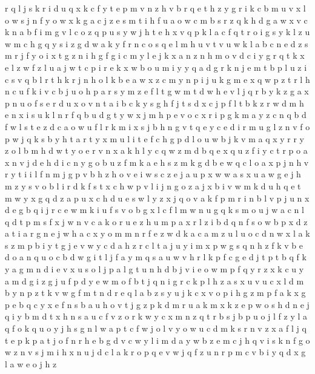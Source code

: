\documentclass{article}
\begin{document}
r q l j s k
r i d u q x k c f y t e p m v n z h
v b r q e
t h z y g r i k c b m u v x l o w s j n f
y
o w x k g a c j z e
s m t i h f u a o w c
m b s r z q k h d g a w x v c
k n a b f i m g v l c o z q p u s y w j h t e
h x v q
p k l a
c f q t r o i g s y k l z u w m
c h g q y s
i z g d w a k y f r n c o s q e l m h u v t
v u w k l a b c n e d z s m r j f y o i x t g
z n i h g
f g i c m y l e j k x a n z
n h m o v d c i y g r q t k x e l z w f
z l u a j w t c p i r e k x
w b o u
m i y
y q a d g r k n j e m t b p l u z i c s v
q b l r t h
k r j n h
o l k b e a w x z c m y n p i j u
k g m e x q w p z t r l h n c u f
k i v c b j u o h p a r s y m z e f l t g w
m t d w h e v l j q r b y k z g a x p n u o f s
e r d u x o v n t a i b c k y s g h f j
t s d
x
c j p f l t b k z r w d m h e n x i s u
k l n r f q b u d g t y w x j m h p e v o c
x r i p g k m a y z c n q b d f w l s t e
z d c a o w u f l r k m i x s j b h n g v t q e y
c e d i r m u g l z n v f o p w j q k s b y h t a
r t y x m u l
i t e f c h g p d l o u w b j k v m a q x y r
r y z o l b m h d w
t y
o e r v n x a k h l y c q w z m d b
q e x
q u z f i y c t r p o a x n v j d e h
d i c n y g o b u z f m k a e h
s z m k g d b e w q c l o a x p j n h v r y t i
i l f n m j g p v b h z
h o v e i w
s c z e j a u p x w
w a s
x u a w g e j h m z y s v o b l i
r d k f s t x c h w p v l i j n g o z a
j x b i v w m k d u h q e t
m w y x
g q d z a p u x c
h d u e s w l y z x j q o v a k f p m r i n b
l v p j u n x d e g b q i
j r c e w m k i u f s v o b g x l
c f l m w n u g q
k s m o u j w a c n l
q d t p m s f x j w n v c a k o r u e z
h u m p a x r l z i b d q n f s o
w b
p x d z a t i
a r
g n e j w h a c x y o m
m n r f e z w d k a c
a
m z u l
u o c d n w x l a k s z m p b i y t g j e
v w y c
d a h z
r c l t a j u y i m x p w g s q n h z f k v b e d o
a n q u
o c b d w g i t l j f a y m q s
a u w v h r l k p f c g e d j
t p
t b q f k y a g m n d i e v x u s o l j p
a l g t u n h d b j v i e o w m p f q y r z x k c
u y a m d g i z
g j u f p
d y e w m o f b t j q n i g r c k p l h z a s x u v
u c x l d m b y n p z t k v w
g f m t n d r e q l a b z s y u j k c x v o p i h
g z m p f
a k x g p e b
q c y x e f n s b a u h o v t j g z p k d m r
u a k m x
k z e p w o s h d n
e j q i y b m d t x h n s a u c f v z o r k w
y c x m n z q t r b s j
b p u o j l f
z y l a q f o
k
q u o y j h s g n l w a p t c f
w j o l v
y o w u c d m k s r n v z x a f l j q t e p
k p a t j o f n r h e b g d v c w y l i
m d
a y w b z e m c j h q v i s k n f g o
w z n v s j
m i h x n u j d c l a k r o p q e v w
j q f z u n
r
p m c v b i y q d x g l a w e o j h z
\end{document}
